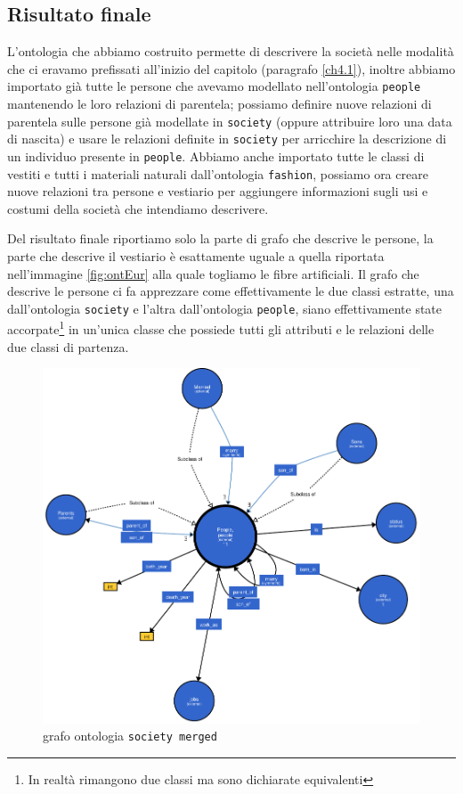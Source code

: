 \subsection{Risultato finale}
L'ontologia che abbiamo costruito permette di descrivere la società nelle modalità che ci eravamo prefissati all'inizio del capitolo (paragrafo \ref{ch4.1}), inoltre abbiamo importato già tutte le persone che avevamo modellato nell'ontologia \verb|people| mantenendo le loro relazioni di parentela; possiamo definire nuove relazioni di parentela sulle persone già modellate in \verb|society| (oppure attribuire loro una data di nascita) e usare le relazioni definite in \verb|society| per arricchire la descrizione di un individuo presente in \verb|people|. Abbiamo anche importato tutte le classi di vestiti e tutti i materiali naturali dall'ontologia \verb|fashion|, possiamo ora creare nuove relazioni tra persone e vestiario  per aggiungere informazioni sugli usi e costumi della società che intendiamo descrivere.

Del risultato finale riportiamo solo la parte di grafo che descrive le persone, la parte che descrive il vestiario è esattamente uguale a quella riportata nell'immagine \ref{fig:ontEur} alla quale togliamo le fibre artificiali. Il grafo che descrive le persone ci fa apprezzare come effettivamente le due classi estratte, una dall'ontologia \verb|society| e l'altra dall'ontologia \verb|people|, siano effettivamente state accorpate\footnote{In realtà rimangono due classi ma sono dichiarate equivalenti} in un'unica classe che possiede tutti gli attributi e le relazioni delle due classi di partenza.
\begin{figure}[H]
	\centering
	\includegraphics[width=\textwidth]{Picture/society_merged.rdf.pdf}
	\caption{grafo ontologia \texttt{society merged}}
\end{figure}

